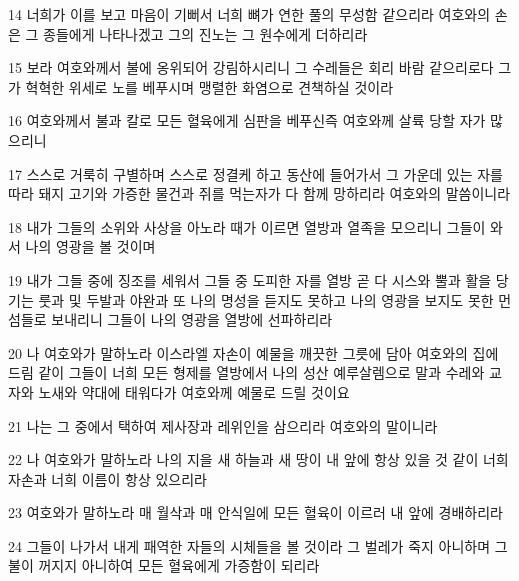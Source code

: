 \par 14 너희가 이를 보고 마음이 기뻐서 너희 뼈가 연한 풀의 무성함 같으리라 여호와의 손은 그 종들에게 나타나겠고 그의 진노는 그 원수에게 더하리라
\par 15 보라 여호와께서 불에 옹위되어 강림하시리니 그 수레들은 회리 바람 같으리로다 그가 혁혁한 위세로 노를 베푸시며 맹렬한 화염으로 견책하실 것이라
\par 16 여호와께서 불과 칼로 모든 혈육에게 심판을 베푸신즉 여호와께 살륙 당할 자가 많으리니
\par 17 스스로 거룩히 구별하며 스스로 정결케 하고 동산에 들어가서 그 가운데 있는 자를 따라 돼지 고기와 가증한 물건과 쥐를 먹는자가 다 함께 망하리라 여호와의 말씀이니라
\par 18 내가 그들의 소위와 사상을 아노라 때가 이르면 열방과 열족을 모으리니 그들이 와서 나의 영광을 볼 것이며
\par 19 내가 그들 중에 징조를 세워서 그들 중 도피한 자를 열방 곧 다 시스와 뿔과 활을 당기는 룻과 및 두발과 야완과 또 나의 명성을 듣지도 못하고 나의 영광을 보지도 못한 먼 섬들로 보내리니 그들이 나의 영광을 열방에 선파하리라
\par 20 나 여호와가 말하노라 이스라엘 자손이 예물을 깨끗한 그릇에 담아 여호와의 집에 드림 같이 그들이 너희 모든 형제를 열방에서 나의 성산 예루살렘으로 말과 수레와 교자와 노새와 약대에 태워다가 여호와께 예물로 드릴 것이요
\par 21 나는 그 중에서 택하여 제사장과 레위인을 삼으리라 여호와의 말이니라
\par 22 나 여호와가 말하노라 나의 지을 새 하늘과 새 땅이 내 앞에 항상 있을 것 같이 너희 자손과 너희 이름이 항상 있으리라
\par 23 여호와가 말하노라 매 월삭과 매 안식일에 모든 혈육이 이르러 내 앞에 경배하리라
\par 24 그들이 나가서 내게 패역한 자들의 시체들을 볼 것이라 그 벌레가 죽지 아니하며 그 불이 꺼지지 아니하여 모든 혈육에게 가증함이 되리라


